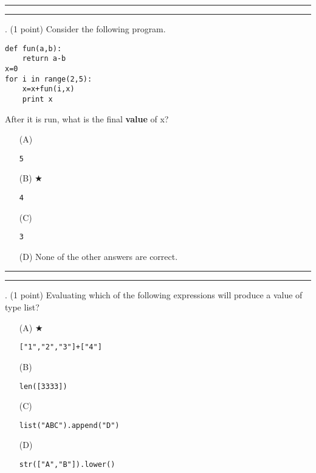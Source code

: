 \documentclass{article}
\begin{document}
\vspace*{2em}
\hrule
\vspace{2em}

\vspace{2em}
\hrule height 2pt


\newpage
{}. (1 point)
Consider the following program.
\begin{verbatim}
def fun(a,b):
    return a-b
x=0
for i in range(2,5):
    x=x+fun(i,x)
    print x
\end{verbatim}
After it is run, what is the final \textbf{value} of x?


\begin{enumerate}
\item[(A)]
\begin{verbatim}5\end{verbatim}

\item[(B)] $\bigstar$ 
\begin{verbatim}4\end{verbatim}

\item[(C)]
\begin{verbatim}3\end{verbatim}

\item[(D)]
None of the other answers are correct.

\end{enumerate}

\vspace*{2em}
\hrule
\vspace{2em}

\vspace{2em}
\hrule height 2pt


\newpage
{}. (1 point)
Evaluating which of the following expressions will produce a value of type list?


\begin{enumerate}
\item[(A)] $\bigstar$ 
\begin{verbatim}["1","2","3"]+["4"] \end{verbatim}

\item[(B)]
\begin{verbatim}len([3333])\end{verbatim}

\item[(C)]
\begin{verbatim}list("ABC").append("D")\end{verbatim}

\item[(D)]
\begin{verbatim}str(["A","B"]).lower() \end{verbatim}

\end{enumerate}
\end{document}
